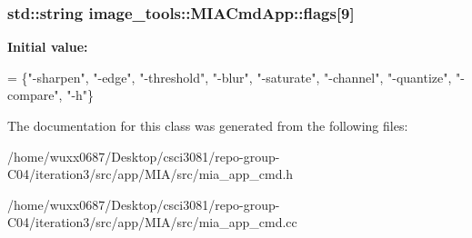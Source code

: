 \subsubsection[{\texorpdfstring{flags}{flags}}]{\setlength{\rightskip}{0pt plus 5cm}std\+::string image\+\_\+tools\+::\+M\+I\+A\+Cmd\+App\+::flags\mbox{[}9\mbox{]}\hspace{0.3cm}{\ttfamily [private]}}\hypertarget{classimage__tools_1_1MIACmdApp_a5a427895cea253d9c477d617ef532680}{}\label{classimage__tools_1_1MIACmdApp_a5a427895cea253d9c477d617ef532680}
{\bfseries Initial value\+:}
\begin{DoxyCode}
= \{\textcolor{stringliteral}{"-sharpen"}, \textcolor{stringliteral}{"-edge"}, \textcolor{stringliteral}{"-threshold"}, \textcolor{stringliteral}{"-blur"},
                          \textcolor{stringliteral}{"-saturate"}, \textcolor{stringliteral}{"-channel"}, \textcolor{stringliteral}{"-quantize"}, \textcolor{stringliteral}{"-compare"}, \textcolor{stringliteral}{"-h"}\}
\end{DoxyCode}


The documentation for this class was generated from the following files\+:\begin{DoxyCompactItemize}
\item 
/home/wuxx0687/\+Desktop/csci3081/repo-\/group-\/\+C04/iteration3/src/app/\+M\+I\+A/src/mia\+\_\+app\+\_\+cmd.\+h\item 
/home/wuxx0687/\+Desktop/csci3081/repo-\/group-\/\+C04/iteration3/src/app/\+M\+I\+A/src/mia\+\_\+app\+\_\+cmd.\+cc\end{DoxyCompactItemize}
